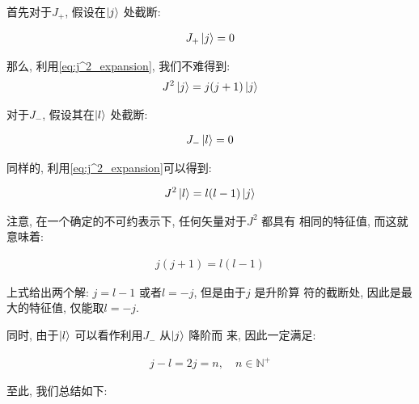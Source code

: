 首先对于$J_{+}$, 假设在$\ket{j}$ 处截断:

\begin{equation}
  \begin{aligned}
    J_{+}\ket{j} = 0
  \end{aligned}
\end{equation}

那么, 利用\ref{eq:j^2_expansion}, 我们不难得到:
\begin{equation}
  \begin{aligned}
    J^{2}\ket{j} = j(j+1) \ket{j}
  \end{aligned}
\end{equation}

对于$J_{-}$, 假设其在$\ket{l}$ 处截断:

\begin{equation}
  \begin{aligned}
    J_{-}\ket{l} = 0
  \end{aligned}
\end{equation}

同样的, 利用\ref{eq:j^2_expansion}可以得到:

\begin{equation}
  \begin{aligned}
    J^{2}\ket{l} = l(l-1)\ket{j}
  \end{aligned}
\end{equation}

注意, 在一个确定的不可约表示下, 任何矢量对于$J^{2}$ 都具有
相同的特征值, 而这就意味着:

\begin{equation}
  \begin{aligned}
    j(j+1) = l(l-1)
  \end{aligned}
\end{equation}

上式给出两个解: $j=l-1$ 或者$l=-j$, 但是由于$j$ 是升阶算
符的截断处, 因此是最大的特征值, 仅能取$l=-j$.

同时, 由于$\ket{l}$ 可以看作利用$J_{-}$ 从$\ket{j}$ 降阶而
来, 因此一定满足:

\begin{equation}
  \begin{aligned}
    j-l = 2j = n,\quad n\in \mathbb{N}^{+}
  \end{aligned}
\end{equation}

至此, 我们总结如下:

